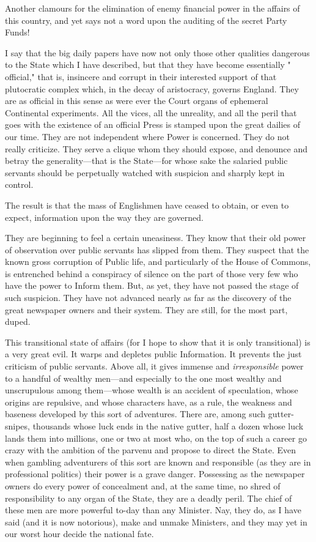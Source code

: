 \documentclass{book}
\begin{document}
Another clamours for the elimination of enemy financial power in the affairs of this country, and yet says not a word upon the auditing of the secret Party Funds!

I say that the big daily papers have now not only those other qualities dangerous to the State which I have described, but that they have become essentially " official," that is, insincere and corrupt in their interested support of that plutocratic complex which, in the decay of aristocracy, governs England. They are as official in this sense as were ever the Court organs of ephemeral Continental experiments. All the vices, all the unreality, and all the peril that goes with the existence of an official Press is stamped upon the great dailies of our time. They are not independent where Power is concerned. They do not really criticize. They serve a clique whom they should expose, and denounce and betray the generality—that is the State—for whose sake the salaried public servants should be perpetually watched with suspicion and sharply kept in control.

The result is that the mass of Englishmen have ceased to obtain, or even to expect, information upon the way they are governed.

They are beginning to feel a certain uneasiness. They know that their old power of observation over public servants has slipped from them. They suspect that the known gross corruption of Public life, and particularly of the House of Commons, is entrenched behind a conspiracy of silence on the part of those very few who have the power to Inform them. But, as yet, they have not passed the stage of such suspicion. They have not advanced nearly as far as the discovery of the great newspaper owners and their system. They are still, for the most part, duped.

This transitional state of affairs (for I hope to show that it is only transitional) is a very great evil. It warps and depletes public Information. It prevents the just criticism of public servants. Above all, it gives immense and \emph{irresponsible} power to a handful of wealthy men—and especially to the one most wealthy and unscrupulous among them—whose wealth is an accident of speculation, whose origins are repulsive, and whose characters have, as a rule, the weakness and baseness developed by this sort of adventures. There are, among such gutter-snipes, thousands whose luck ends in the native gutter, half a dozen whose luck lands them into millions, one or two at most who, on the top of such a career go crazy with the ambition of the parvenu and propose to direct the State. Even when gambling adventurers of this sort are known and responsible (as they are in professional politics) their power is a grave danger. Possessing as the newspaper owners do every power of concealment and, at the same time, no shred of responsibility to any organ of the State, they are a deadly peril. The chief of these men are more powerful to-day than any Minister. Nay, they do, as I have said (and it is now notorious), make and unmake Ministers, and they may yet in our worst hour decide the national fate.
\end{document}
